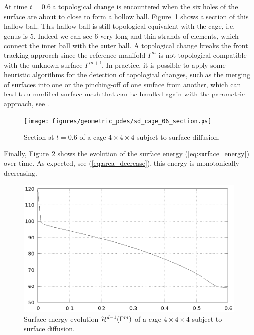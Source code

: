 At time $t=0.6$ a topological change is encountered when the six holes of the
surface are about to close to form a hollow ball.
Figure~\ref{fig:sd_cage_section} shows a section of this hallow ball. This
hallow ball is still topological equivalent with the cage, i.e. genus is 5.
Indeed we can see 6 very long and thin strands of elements, which connect the
inner ball with the outer ball.  A topological change breaks the front tracking
approach since the reference manifold $\Gamma^m$ is not topological compatible
with the unknown surface $\Gamma^{m+1}$. In practice, it is possible to apply
some heuristic algorithms for the detection of topological changes, such as the
merging of surfaces into one or the pinching-off of one surface from another,
which can lead to a modified surface mesh that can be handled again with the
parametric approach, see \cite{Sacconi}.

\begin{figure}[htbp]
\centering
\texttt{[image: figures/geometric\_pdes/sd\_cage\_06\_section.ps]}
\caption[Surface diffusion cage section]{Section at $t=0.6$ of a cage $4 \times
4 \times 4$ subject to surface diffusion.}
\label{fig:sd_cage_section}
\end{figure}

Finally, Figure~\ref{fig:sd_cage_energy} shows the evolution of the surface
energy (\ref{eq:surface_energy}) over time. As expected, see
(\ref{eq:area_decrease}), this energy is monotonically decreasing.

\begin{figure}[htbp]
\centering
\includegraphics[width=.45\textwidth]
{figures/geometric_pdes/sd_cage_energy.ps}
\caption[Surface diffusion cage surface energy]{Surface energy evolution
$\mathcal{H}^{d-1}(\Gamma^m)$ of a cage $4 \times 4 \times 4$ subject to surface
diffusion.}
\label{fig:sd_cage_energy}
\end{figure}
